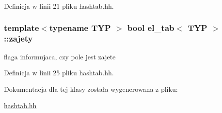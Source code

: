 Definicja w linii 21 pliku hashtab.\-hh.

\hypertarget{classel__tab_aa757d12b4a8d169c50bd8e6b8d0d1fd2}{
\subsubsection[{zajety}]{\setlength{\rightskip}{0pt plus 5cm}template$<$typename T\-Y\-P $>$ bool {\bf el\-\_\-tab}$<$ T\-Y\-P $>$\-::zajety}}\label{classel__tab_aa757d12b4a8d169c50bd8e6b8d0d1fd2}


flaga informujaca, czy pole jest zajete 



Definicja w linii 25 pliku hashtab.\-hh.



Dokumentacja dla tej klasy została wygenerowana z pliku\-:\begin{DoxyCompactItemize}
\item 
\hyperlink{hashtab_8hh}{hashtab.\-hh}\end{DoxyCompactItemize}
